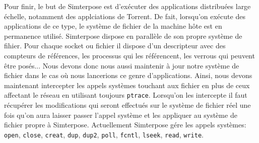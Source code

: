 Pour finir, le but de Simterpose est d'exécuter des applications distribuées large échelle, notamment des applciations de Torrent. De fait, lorsqu'on exécute des applications de ce type, le système de fichier de la machine hôte est en permanence utilisé. Simterpose dispose en parallèle de son propre système de fihier. Pour chaque socket ou fichier il dispose d'un descripteur avec des compteurs de références, les processus qui les référencent, les verrous qui peuvent être posés... Nous devons donc nous aussi maintenir à jour notre système de fichier dans le cas où nous lancerions ce genre d'applications. Ainsi, nous devons maintenant intercepter les appels systèmes touchant aux fichier en plus de ceux affectant le réseau en utilisant toujours \texttt{ptrace}. Lorsqu'on les intercepte il faut récupérer les modifications qui seront effectués sur le système de fichier réel une fois qu'on aura laisser passer l'appel système et les appliquer au système de fichier propre à Simterpose. Actuellement Simterpose gére les appels systèmes: \texttt{open},  \texttt{close}, \texttt{creat}, \texttt{dup}, \texttt{dup2}, \texttt{poll}, \texttt{fcntl}, \texttt{lseek}, \texttt{read}, \texttt{write}.
